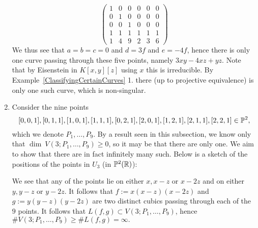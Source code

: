 \begin{example}
\begin{enumerate}
            $$\begin{pmatrix}
                1 & 0 & 0 & 0 & 0 & 0\\
                0 & 1 & 0 & 0 & 0 & 0\\
                0 & 0 & 1 & 0 & 0 & 0\\
                1 & 1 & 1 & 1 & 1 & 1\\
                1 & 4 & 9 & 2 & 3 & 6
            \end{pmatrix}$$
            We thus see that $a=b=c = 0$ and $d = 3f$ and $e = -4f$, hence there is only one curve passing through these five points, namely $3xy-4xz+yz$. Note that by Eisenstein in $K[x,y][z]$ using $x$ this is irreducible. By Example~\ref{ClassifyingCertainCurves} 1. there (up to projective equivalence) is only one such curve, which is non-singular.  
            \item Consider the nine points 
            $$[0,0,1],[0,1,1],[1,0,1],[1,1,1],[0,2,1],[2,0,1],[1,2,1],[2,1,1],[2,2,1]\in\mathbb{P}^2,$$
            which we denote $P_1,\dots,P_9$. By a result seen in this subsection, we know only that $\dim \ V(3; P_1,\dots,P_9)\geq 0$, so it may be that there are only one. We aim to show that there are in fact infinitely many such. Below is a sketch of the positions of the points in $U_3$ (in $\mathbb{P}^2(\mathbb{R})$):
            
            \begin{center}
                
            \end{center}

             We see that any of the points lie on either $x,x-z$ or $x-2z$ and on either $y,y-z$ or $y-2z$. It follows that $f:= x(x-z)(x-2z)$ and $g:=y(y-z)(y-2z)$ are two distinct cubics passing through each of the $9$ points. It follows that $L(f,g)\subset V(3;P_1,\dots,P_9)$, hence $\#V(3;P_1,\dots,P_9)\geq \# L(f,g)=\infty.$
        \end{enumerate}
    \end{example}
    
